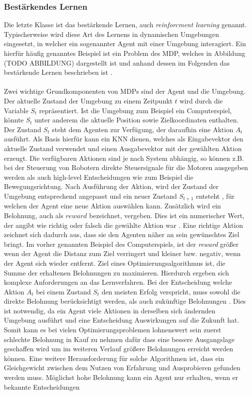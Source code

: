 \subsubsection{Bestärkendes Lernen}
\label{subsubsec:reinforcment_learning}
Die letzte Klasse ist das bestärkende Lernen, auch \emph{reinforcment learning} genannt. Typischerweise wird diese Art des Lernens in dynamischen Umgebungen eingesetzt, in welcher ein sogenannter Agent mit einer Umgebung interagiert. Ein hierfür häufig  genanntes Beispiel ist ein Problem des \ac{MDP}, welches in Abbildung (TODO ABBILDUNG) dargestellt ist und anhand dessen im Folgenden das bestärkende Lernen beschrieben ist \cite{sutton2018reinforcement}. 
\\\\
Zwei wichtige Grundkomponenten von \acp{MDP} sind der Agent und die Umgebung. Der aktuelle Zustand der Umgebung zu einem Zeitpunkt $t$ wird durch die Variable $S_t$ repräsentiert. Ist die Umgebung zum Beispiel ein Computerspiel, könnte $S_t$ unter anderem die aktuelle Position sowie Zielkoordinaten enthalten. Der Zustand $S_t$ steht dem Agenten zur Verfügung, der daraufhin eine Aktion $A_t$ ausführt. Als Basis hierfür kann ein \ac{KNN} dienen, welches als Eingabevektor den aktuelle Zustand verwendet und einen Ausgabevektor mit der gewählten Aktion erzeugt. Die verfügbaren Aktionen sind je nach System abhängig, so können z.B. bei der Steuerung von Robotern direkte Steuersignale für die Motoren ausgegeben werden als auch high-level Entscheidungen wie zum Beispiel die Bewegungsrichtung. Nach Ausführung der Aktion, wird der Zustand der Umgebung entsprechend angepasst und ein neuer Zustand $S_{t+1}$ entsteht \cite{sutton2018reinforcement}, für welchen der Agent eine neue Aktion auswählen kann. Zusätzlich wird ein Belohnung, auch als $reward$ bezeichnet, vergeben. Dies ist ein numerischer Wert, der angibt wie richtig oder falsch die gewählte Aktion war \cite{zell2003simulation}. Eine richtige Aktion zeichnet sich dadurch aus, dass sie den Agenten näher an sein gewünschtes Ziel bringt. Im vorher genannten Beispiel des Computerspiels, ist der \emph{reward} größer wenn der Agent die Distanz zum Ziel verringert und kleiner bzw. negativ, wenn der Agent sich wieder entfernt. Ziel eines Optimierungsalgorithmus ist, die Summe der erhaltenen Belohnungen zu maximieren. Hierdurch ergeben sich komplexe Anforderungen an das Lernverfahren. Bei der Entscheidung welche Aktion $A_t$ bei einem Zustand $S_t$ den meisten Erfolg verspricht, muss sowohl die direkte Belohnung berücksichtigt werden, als auch zukünftige Belohnungen \cite{sutton2018reinforcement}. Dies ist notwendig, da ein Agent viele Aktionen in derselben sich ändernden Umgebung ausführt und eine Entscheidung Auswirkungen auf die Zukunft hat. Somit kann es bei vielen Optimierungsproblemen  lohnenswert sein zuerst schlechte Belohnung in Kauf zu nehmen dafür dass eine bessere Ausgangslage geschaffen wird um im weiteren Verlauf größere Belohnungen erreicht werden können. Eine weitere Herausforderung für solche Algorithmen ist, dass ein Gleichgewicht zwischen dem Nutzen von Erfahrung und Ausprobieren gefunden werden muss. Möglichst hohe Belohnung kann ein Agent nur erhalten, wenn er bekannte Entscheidungen 